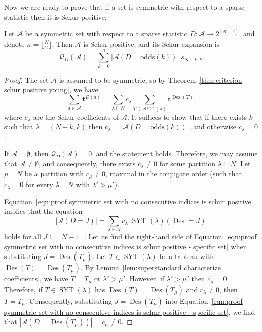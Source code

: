 \documentclass[ALCO]{cedram}
\newcommand{\Des}{\operatorname{Des}}
\newcommand{\Syt}{\operatorname{SYT}}
\newcommand{\Q}{\mathcal{Q}}
\newcommand{\A}{\mathcal{A}}
\newcommand{\odds}{\mathrm{odds}}
\begin{document}
Now we are ready to prove that if a set is symmetric with respect to a sparse statistic then it is Schur-positive:
\begin{lemma}
\label{lem:if two rows and symmetric then schur positive}
    Let $\A$ be a symmetric set with respect to a sparse statistic $D:\A \to 2^{[N-1]}$, and denote $n = \lfloor\frac{N}{2} \rfloor$. Then $\A$ is Schur-positive, and its Schur expansion is
    \[
        \Q_{D} (\A) = \sum_{k=0}^n |\A(D = \odds(k))|\; s_{N-k,k}.
    \]
\end{lemma}
\begin{proof}
    The set $\A$ is assumed to be symmetric, so by Theorem~\ref{thm:criterion schur positive young}, we have
    \begin{equation}\label{eqn:proof symmetric set with no consecutive indices is schur positive}
        \sum_{a \in \A} \boldsymbol{t}^{D(a)} = \sum_{\lambda \vdash N} c_\lambda \sum_{T \in \Syt(\lambda)} \boldsymbol{t}^{\Des(T)},
    \end{equation}
    where $c_\lambda$ are the Schur coefficients of $\A$. It suffices to show that if there exists $k$ such that $\lambda=(N-k,k)$ then $c_\lambda = |\A(D = \odds(k))|$, and otherwise $c_\lambda=0$.

    If $\A = \emptyset$, then $\Q_{D}(\A) = 0$, and the statement holds. Therefore, we may assume that $\A \ne \emptyset$, and consequently, there exists $c_\lambda \ne 0$ for some partition $\lambda \vdash N$. Let $\mu \vdash N$ be a partition with $c_\mu \ne 0$, maximal in the conjugate order (\ie such that $c_\lambda = 0$ for every $\lambda \vdash N$ with $\lambda' > \mu'$).
    
    Equation~\eqref{eqn:proof symmetric set with no consecutive indices is schur positive} implies that the equation
    \begin{equation}\label{eqn:proof symmetric set with no consecutive indices is schur positive - specific set}
        |\A(D = J)| = \sum_{\lambda \vdash N} c_\lambda \left|\Syt(\lambda)(\Des = J)\right|
    \end{equation}
    holds for all $J \subseteq [N-1]$. Let us find the right-hand side of Equation~\eqref{eqn:proof symmetric set with no consecutive indices is schur positive - specific set} when substituting $J = \Des(T_\mu)$. Let $T \in \Syt(\lambda)$ be a tableau with $\Des(T) = \Des(T_\mu)$. By Lemma~\ref{lem:superstandard characterize coefficients}, we have $T = T_\mu$ or $\lambda' > \mu'$. However, if $\lambda' > \mu'$ then $c_\lambda = 0$. Therefore, if $T \in \Syt(\lambda)$ has $\Des(T) = \Des(T_\mu)$ and $c_\lambda \ne 0$, then $T = T_\mu$. Consequently, substituting $J = \Des(T_\mu)$ into Equation~\eqref{eqn:proof symmetric set with no consecutive indices is schur positive - specific set}, we find that $|\A(D = \Des(T_\mu))| = c_\mu \neq 0$.


\end{proof}
\end{document}
